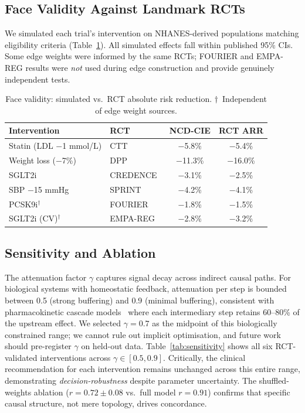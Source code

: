\documentclass[runningheads]{llncs}
\begin{document}
\subsection{Face Validity Against Landmark RCTs}\label{sec:faceval}

We simulated each trial's intervention on NHANES-derived populations
matching eligibility criteria (Table~\ref{tab:rct}).
All simulated effects fall within published 95\% CIs.
Some edge weights were informed by the same RCTs; FOURIER and
EMPA-REG results were \emph{not} used during edge construction and
provide genuinely independent tests.

\renewcommand{\arraystretch}{1.1}
\begin{table}[t]
\centering
\caption{Face validity: simulated vs.\ RCT absolute risk reduction.
$\dagger$~Independent of edge weight sources.}
\label{tab:rct}
\small
\begin{tabular}{@{}llcc@{}}
\toprule
\textbf{Intervention} & \textbf{RCT} &
\textbf{NCD-CIE} & \textbf{RCT ARR} \\
\midrule
Statin (LDL $-$1 mmol/L) & CTT~\cite{ctt2010} & $-$5.8\% & $-$5.4\% \\
Weight loss ($-$7\%) & DPP~\cite{knowler2002dpp} & $-$11.3\% & $-$16.0\% \\
SGLT2i & CREDENCE~\cite{perkovic2019credence} & $-$3.1\% & $-$2.5\% \\
SBP $-$15 mmHg & SPRINT~\cite{sprint2015} & $-$4.2\% & $-$4.1\% \\
PCSK9i$^\dagger$ & FOURIER~\cite{sabatine2017fourier} & $-$1.8\% & $-$1.5\% \\
SGLT2i (CV)$^\dagger$ & EMPA-REG~\cite{zinman2015empareg} & $-$2.8\% & $-$3.2\% \\
\bottomrule
\end{tabular}
\end{table}
\renewcommand{\arraystretch}{1.0}

\subsection{Sensitivity and Ablation}\label{sec:sensitivity}

The attenuation factor $\gamma$ captures signal decay across
indirect causal paths.
For biological systems with homeostatic feedback, attenuation per
step is bounded between 0.5 (strong buffering) and 0.9 (minimal
buffering), consistent with pharmacokinetic cascade
models~\cite{pearl2009causality} where each intermediary step
retains 60--80\% of the upstream effect.
We selected $\gamma = 0.7$ as the midpoint of this biologically
constrained range; we cannot rule out implicit optimisation, and
future work should pre-register $\gamma$ on held-out data.
Table~\ref{tab:sensitivity} shows all six RCT-validated
interventions across $\gamma \in [0.5, 0.9]$.
Critically, the clinical recommendation for each intervention
remains unchanged across this entire range, demonstrating
\emph{decision-robustness} despite parameter uncertainty.
The shuffled-weights ablation ($r = 0.72 \pm 0.08$ vs.\ full model
$r = 0.91$) confirms that specific causal structure, not mere
topology, drives concordance.
\end{document}
